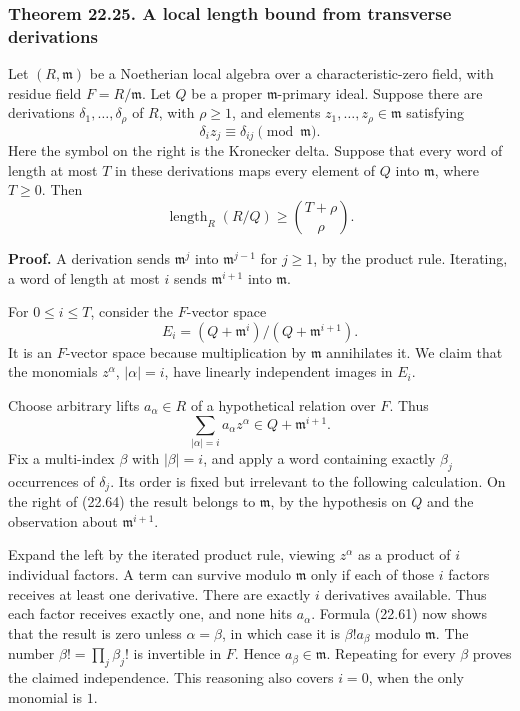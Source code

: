 \documentclass[
  11pt,
  a4paper,
]{article}
\newcounter{none} %
\begin{document}
\subsubsection{Theorem 22.25. A local length bound from transverse
derivations}\label{theorem-22.25.-a-local-length-bound-from-transverse-derivations}

Let \((R,\mathfrak m)\) be a Noetherian local algebra over a
characteristic-zero field, with residue field \(F=R/\mathfrak m\). Let
\(Q\) be a proper \(\mathfrak m\)-primary ideal. Suppose there are
derivations \(\delta_1,\ldots,\delta_\rho\) of \(R\), with \(\rho\ge1\),
and elements \(z_1,\ldots,z_\rho\in\mathfrak m\) satisfying \[
 \delta_i z_j\equiv\delta_{ij}\pmod{\mathfrak m}.
 \tag{22.61}
\] Here the symbol on the right is the Kronecker delta. Suppose that
every word of length at most \(T\) in these derivations maps every
element of \(Q\) into \(\mathfrak m\), where \(T\ge0\). Then \[
 \operatorname{length}_R(R/Q)\ge\binom{T+\rho}{\rho}.
 \tag{22.62}
\]

\textbf{Proof.} A derivation sends \(\mathfrak m^j\) into
\(\mathfrak m^{j-1}\) for \(j\ge1\), by the product rule. Iterating, a
word of length at most \(i\) sends \(\mathfrak m^{i+1}\) into
\(\mathfrak m\).

For \(0\le i\le T\), consider the \(F\)-vector space \[
 E_i=(Q+\mathfrak m^i)/(Q+\mathfrak m^{i+1}).
 \tag{22.63}
\] It is an \(F\)-vector space because multiplication by \(\mathfrak m\)
annihilates it. We claim that the monomials \(z^\alpha\),
\(|\alpha|=i\), have linearly independent images in \(E_i\).

Choose arbitrary lifts \(a_\alpha\in R\) of a hypothetical relation over
\(F\). Thus \[
 \sum_{|\alpha|=i}a_\alpha z^\alpha\in Q+\mathfrak m^{i+1}.
 \tag{22.64}
\] Fix a multi-index \(\beta\) with \(|\beta|=i\), and apply a word
containing exactly \(\beta_j\) occurrences of \(\delta_j\). Its order is
fixed but irrelevant to the following calculation. On the right of
(22.64) the result belongs to \(\mathfrak m\), by the hypothesis on
\(Q\) and the observation about \(\mathfrak m^{i+1}\).

Expand the left by the iterated product rule, viewing \(z^\alpha\) as a
product of \(i\) individual factors. A term can survive modulo
\(\mathfrak m\) only if each of those \(i\) factors receives at least
one derivative. There are exactly \(i\) derivatives available. Thus each
factor receives exactly one, and none hits \(a_\alpha\). Formula (22.61)
now shows that the result is zero unless \(\alpha=\beta\), in which case
it is \(\beta!a_\beta\) modulo \(\mathfrak m\). The number
\(\beta!=\prod_j\beta_j!\) is invertible in \(F\). Hence
\(a_\beta\in\mathfrak m\). Repeating for every \(\beta\) proves the
claimed independence. This reasoning also covers \(i=0\), when the only
monomial is \(1\).
\end{document}

